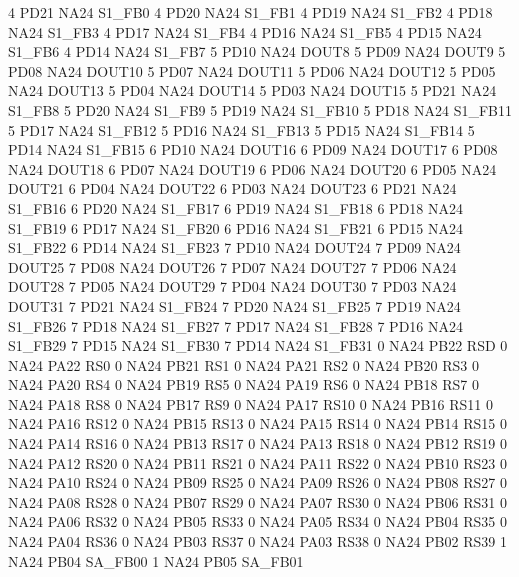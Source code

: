 4   PD21    NA24    S1_FB0
4   PD20    NA24    S1_FB1
4   PD19    NA24    S1_FB2
4   PD18    NA24    S1_FB3
4   PD17    NA24    S1_FB4
4   PD16    NA24    S1_FB5
4   PD15    NA24    S1_FB6
4   PD14    NA24    S1_FB7
5   PD10    NA24    DOUT8
5   PD09    NA24    DOUT9
5   PD08    NA24    DOUT10
5   PD07    NA24    DOUT11
5   PD06    NA24    DOUT12
5   PD05    NA24    DOUT13
5   PD04    NA24    DOUT14
5   PD03    NA24    DOUT15
5   PD21    NA24    S1_FB8
5   PD20    NA24    S1_FB9
5   PD19    NA24    S1_FB10
5   PD18    NA24    S1_FB11
5   PD17    NA24    S1_FB12
5   PD16    NA24    S1_FB13
5   PD15    NA24    S1_FB14
5   PD14    NA24    S1_FB15
6   PD10    NA24    DOUT16
6   PD09    NA24    DOUT17
6   PD08    NA24    DOUT18
6   PD07    NA24    DOUT19
6   PD06    NA24    DOUT20
6   PD05    NA24    DOUT21
6   PD04    NA24    DOUT22
6   PD03    NA24    DOUT23
6   PD21    NA24    S1_FB16
6   PD20    NA24    S1_FB17
6   PD19    NA24    S1_FB18
6   PD18    NA24    S1_FB19
6   PD17    NA24    S1_FB20
6   PD16    NA24    S1_FB21
6   PD15    NA24    S1_FB22
6   PD14    NA24    S1_FB23
7   PD10    NA24    DOUT24
7   PD09    NA24    DOUT25
7   PD08    NA24    DOUT26
7   PD07    NA24    DOUT27
7   PD06    NA24    DOUT28
7   PD05    NA24    DOUT29
7   PD04    NA24    DOUT30
7   PD03    NA24    DOUT31
7   PD21    NA24    S1_FB24
7   PD20    NA24    S1_FB25
7   PD19    NA24    S1_FB26
7   PD18    NA24    S1_FB27
7   PD17    NA24    S1_FB28
7   PD16    NA24    S1_FB29
7   PD15    NA24    S1_FB30
7   PD14    NA24    S1_FB31
0   NA24    PB22    RSD
0   NA24    PA22    RS0
0   NA24    PB21    RS1
0   NA24    PA21    RS2
0   NA24    PB20    RS3
0   NA24    PA20    RS4
0   NA24    PB19    RS5
0   NA24    PA19    RS6
0   NA24    PB18    RS7
0   NA24    PA18    RS8
0   NA24    PB17    RS9
0   NA24    PA17    RS10
0   NA24    PB16    RS11
0   NA24    PA16    RS12
0   NA24    PB15    RS13
0   NA24    PA15    RS14
0   NA24    PB14    RS15
0   NA24    PA14    RS16
0   NA24    PB13    RS17
0   NA24    PA13    RS18
0   NA24    PB12    RS19
0   NA24    PA12    RS20
0   NA24    PB11    RS21
0   NA24    PA11    RS22
0   NA24    PB10    RS23
0   NA24    PA10    RS24
0   NA24    PB09    RS25
0   NA24    PA09    RS26
0   NA24    PB08    RS27
0   NA24    PA08    RS28
0   NA24    PB07    RS29
0   NA24    PA07    RS30
0   NA24    PB06    RS31
0   NA24    PA06    RS32
0   NA24    PB05    RS33
0   NA24    PA05    RS34
0   NA24    PB04    RS35
0   NA24    PA04    RS36
0   NA24    PB03    RS37
0   NA24    PA03    RS38
0   NA24    PB02    RS39
1   NA24    PB04    SA_FB00
1   NA24    PB05    SA_FB01
